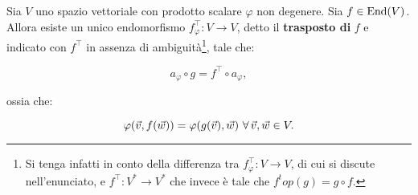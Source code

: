 \begin{proposition}
	Sia $V$ uno spazio vettoriale con prodotto scalare $\varphi$ non degenere.
	Sia $f \in \operatorname{End}(V)$. Allora esiste un unico endomorfismo
	$f_\varphi^\top : V \to V$, detto il \textbf{trasposto di} $f$ e indicato con $f^\top$ in assenza
	di ambiguità\footnote{Si tenga infatti in conto della differenza tra $f_\varphi^\top : V \to V$, di cui si discute
		nell'enunciato, e $f^\top : V^* \to V^*$ che invece è tale che $f^top(g) = g \circ f$.}, tale che:
	
	\[ a_\varphi \circ g = f^\top \circ a_\varphi, \]
	
	\vskip 0.05in
	
	ossia che:
	
	\[ \varphi(\v, f(\w)) = \varphi(g(\v), \w) \, \forall \v, \w \in V. \]
\end{proposition}

